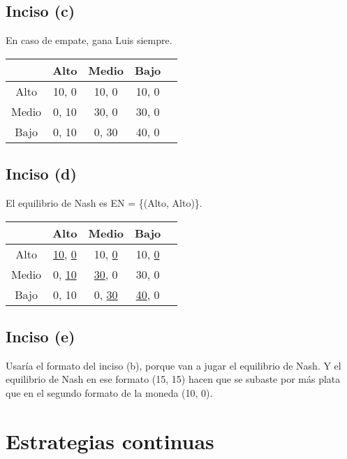 \documentclass{article}
\newcommand{\ulcolor}[2][Red]{\setulcolor{#1}\ul{#2}}
\begin{document}
        \subsection*{Inciso (c)}
            En caso de empate, gana Luis siempre.
            \begin{table}[H]
                \begin{tabular}{|c|c|c|c|c|}
                            \hline
                                    & Alto & Medio & Bajo \\ \hline
                            Alto    & 10, 0 & 10, 0 & 10, 0 \\ 
                            Medio   & 0, 10 & 30, 0 & 30, 0 \\
                            Bajo    & 0, 10 & 0, 30 & 40, 0 \\ \hline
                \end{tabular}
            \end{table}
        \subsection*{Inciso (d)}
            El equilibrio de Nash es EN = \{(Alto, Alto)\}.
            \begin{table}[H]
                \begin{tabular}{|c|c|c|c|c|}
                    \hline
                            & Alto & Medio & Bajo \\ \hline
                    Alto    & \ulcolor[Red]{10}, \ulcolor[Blue]{0} & 10, \ulcolor[Blue]{0} & 10, \ulcolor[Blue]{0} \\ 
                    Medio   & 0, \ulcolor[Blue]{10} & \ulcolor[Red]{30}, 0 & 30, 0 \\
                    Bajo    & 0, 10 & 0, \ulcolor[Blue]{30} & \ulcolor[Red]{40}, 0 \\ \hline
                \end{tabular}
            \end{table}
        \subsection*{Inciso (e)}
            Usaría el formato del inciso (b), porque van a jugar el equilibrio de Nash. Y el equilibrio de Nash en ese formato (15, 15) hacen que se subaste por más plata que en el segundo formato de la moneda (10, 0).
    \section{Estrategias continuas}
\end{document}
